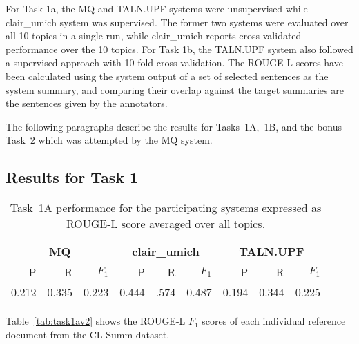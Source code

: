 \documentclass[11pt]{article}
\begin{document}
For Task 1a, the MQ and TALN.UPF systems were unsupervised while clair\_umich system was supervised. The former two systems were evaluated over all 10 topics in a single run, while clair\_umich reports cross validated performance over the 10 topics. For Task 1b, the TALN.UPF system also followed a supervised approach with 10-fold cross validation. The ROUGE-L scores have been calculated using the system output of a set of selected sentences as the system summary, and comparing their overlap
against the target summaries are the sentences given by the annotators. 

The following paragraphs describe the results for Tasks~1A,~1B, and the
bonus Task~2 which was attempted by the MQ system.

\subsection{Results for Task 1}

\begin{table*}
\centering
	\begin{tabular}{|r|r|r|r|r|r|r|r|r|}
	\hline
	\multicolumn{3}{|c|}{MQ} & \multicolumn{3}{|c|}{clair\_umich} & \multicolumn{3}{|c|}{TALN.UPF}\\
	\hline
	P & R & $F_1$ & P & R & $F_1$ & P & R & $F_1$\\
	\hline
 	0.212& 0.335& 0.223& 0.444& .574& 0.487& 0.194& 0.344& 0.225\\
	\hline
	\end{tabular}
\caption{Task~1A performance for the participating systems expressed as ROUGE-L score
 averaged over all topics.}
\label{tab:task1a}
\end{table*}

Table~\ref{tab:task1av2} shows the ROUGE-L $F_1$ scores of each individual 
reference document from the CL-Summ dataset.
\end{document}

